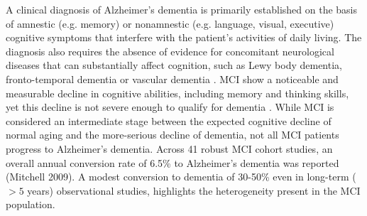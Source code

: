 \documentclass[authoryear]{elsarticle}
\begin{document}
A clinical diagnosis of Alzheimer's dementia is primarily established on the basis of amnestic (e.g. memory) or nonamnestic (e.g. language, visual, executive) cognitive symptoms that interfere with the patient's activities of daily living. The diagnosis also requires the absence of evidence for concomitant neurological diseases that can substantially affect cognition, such as Lewy body dementia, fronto-temporal dementia or vascular dementia \citep{Mckhann2011}. MCI show a noticeable and measurable decline in cognitive abilities, including memory and thinking skills, yet this decline is not severe enough to qualify for dementia \citep{Petersen2014}. While MCI is considered an intermediate stage between the expected cognitive decline of normal aging and the more-serious decline of dementia, not all MCI patients progress to Alzheimer's dementia. Across 41 robust MCI cohort studies, an overall annual conversion rate of 6.5\% to Alzheimer's dementia was reported (Mitchell 2009). A modest conversion to dementia of 30-50\% even in long-term ($>5$ years) observational studies, highlights the heterogeneity present in the MCI population.
\end{document}
